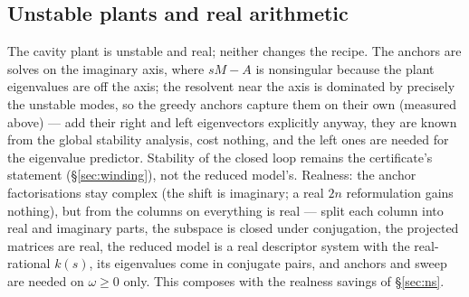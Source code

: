 \documentclass[11pt,a4paper]{article}
\begin{document}
{{\subsection{Unstable plants and real arithmetic}
The cavity plant is unstable and real; neither changes the recipe.  The anchors are solves
on the imaginary axis, where $s M-A$ is nonsingular because the plant eigenvalues are off
the axis; the resolvent near the axis is dominated by precisely the unstable modes, so the
greedy anchors capture them on their own (measured above) --- add their right and left
eigenvectors explicitly anyway, they are known from the global stability analysis, cost
nothing, and the left ones are needed for the eigenvalue predictor.  Stability of the
closed loop remains the certificate's statement (\S\ref{sec:winding}), not the reduced
model's.  Realness: the anchor factorisations stay complex (the shift is imaginary; a real
$2n$ reformulation gains nothing), but from the columns on everything is real --- split
each column into real and imaginary parts, the subspace is closed under conjugation, the
projected matrices are real, the reduced model is a real descriptor system with the
real-rational $k(s)$, its eigenvalues come in conjugate pairs, and anchors and sweep are
needed on $\omega\ge0$ only.  This composes with the realness savings of \S\ref{sec:ns}.

}}
\end{document}
